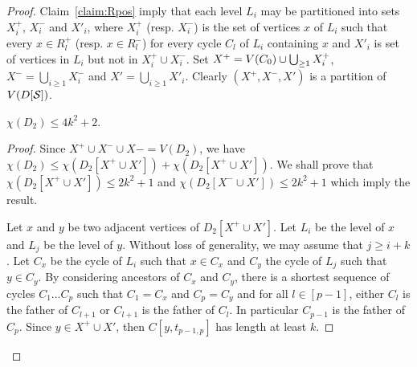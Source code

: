 \documentclass{endm}
\begin{document}
\begin{proof}
Claim~\ref{claim:Rpos} imply that each level $L_i$ may be partitioned into sets $X^+_i$, $X^-_i$ and $X'_i$, where
$X^+_i$ (resp.  $X^-_i$) is the set of vertices $x$ of $L_i$ such that every $x\in R^+_l$ (resp. $x\in R^-_l$)
for every cycle $C_l$ of $L_i$ containing $x$ and $X'_i$ is set of vertices in $L_i$ but not in $X^+_i\cup X^-_i$. 
Set $X^+=V(C_0) \cup \bigcup_{\relax\geq 1} X^+_i$, $X^-=\bigcup_{i\geq 1} X^-_i$ and $X'=\bigcup_{i\geq 1} X'_i$.
Clearly $(X^+, X^-, X')$ is a partition of $V(D[{\cal S}])$.


%





\begin{claim}\label{claim:D2}
$\chi(D_2)\leq 4k^2 +2 $.
\end{claim}

\begin{proof}
Since $X^+\cup X^-\cup X-=V(D_2)$, we have $\chi(D_2) \leq \chi (D_2[X^+\cup X']) + \chi(D_2[X^+\cup X'])$.
We shall prove that $\chi (D_2[X^+\cup X'])\leq 2k^2+1$ and $\chi (D_2[X^-\cup X'])\leq 2k^2+1$ which imply the result.


\medskip

Let $x$ and $y$ be two adjacent vertices of $D_2[X^+\cup X']$. Let $L_i$ be the level of $x$ and $L_j$ be the level of $y$. Without loss of generality, we may assume that $j\geq i+k$.
Let $C_x$ be the cycle of $L_i$ such that $x \in C_x$ and $C_y$ the cycle of $L_j$ such that $y \in C_y$.
By considering ancestors of $C_x$ and $C_y$, there is a shortest sequence of cycles $C_1 \dots C_p$ such that $C_1 = C_x$ and $C_p = C_y$ and for all $l\in [p-1]$, either $C_l$ is the father of $C_{l+1}$ or $C_{l+1}$ is the father of $C_l$.
In particular $C_{p-1}$ is the father of $C_p$. Since $y\in X^+\cup X'$, then $C[y,t_{p-1,p}]$ has length at least $k$.


\end{proof}
\end{proof}
\end{document}
